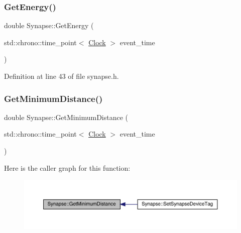 \subsubsection{\texorpdfstring{Get\+Energy()}{GetEnergy()}}
{\footnotesize\ttfamily double Synapse\+::\+Get\+Energy (\begin{DoxyParamCaption}\item[{std\+::chrono\+::time\+\_\+point$<$ \hyperlink{universe_8h_a0ef8d951d1ca5ab3cfaf7ab4c7a6fd80}{Clock} $>$}]{event\+\_\+time }\end{DoxyParamCaption})\hspace{0.3cm}{\ttfamily [inline]}}



Definition at line 43 of file synapse.\+h.

\mbox{\label{class_synapse_a9c59a28a562e1f3f964b0196af21d00f}} 
\subsubsection{\texorpdfstring{Get\+Minimum\+Distance()}{GetMinimumDistance()}}
{\footnotesize\ttfamily double Synapse\+::\+Get\+Minimum\+Distance (\begin{DoxyParamCaption}\item[{std\+::chrono\+::time\+\_\+point$<$ \hyperlink{universe_8h_a0ef8d951d1ca5ab3cfaf7ab4c7a6fd80}{Clock} $>$}]{event\+\_\+time }\end{DoxyParamCaption})}

Here is the caller graph for this function\+:\nopagebreak
\begin{figure}[H]
\begin{center}
\leavevmode
\includegraphics[width=350pt]{class_synapse_a9c59a28a562e1f3f964b0196af21d00f_icgraph}
\end{center}
\end{figure}
\mbox{\label{class_synapse_aee76302a55cb0728497caa7a9f5ddeb5}} 
